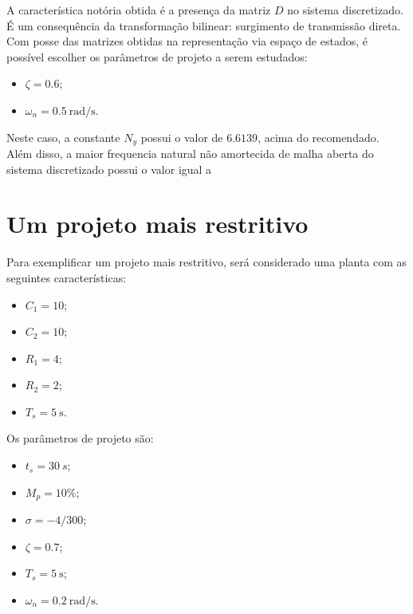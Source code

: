 A característica notória obtida é a presença da matriz $D$ no sistema discretizado. É um consequência da transformação bilinear: surgimento de transmissão direta. Com posse das matrizes obtidas na representação via espaço de estados, é possível escolher os parâmetros de projeto a serem estudados:
\begin{itemize}
  \item $\zeta = 0.6$;
  \item $\omega_n = \SI{0.5}{\radian/\second}$.
\end{itemize}

Neste caso, a constante $N_y$ possui o valor de $6.6139$, acima do recomendado. Além disso, a maior frequencia natural não amortecida de malha aberta do sistema discretizado possui o valor igual a

\section{Um projeto mais restritivo}
Para exemplificar um projeto mais restritivo, será considerado uma planta com as seguintes características:
\begin{itemize}
  \item $C_1 = 10$;
  \item $C_2 = 10$;
  \item $R_1 = 4$;
  \item $R_2 = 2$;
  \item $T_s = \SI{5}{\second}$.
\end{itemize}

Os parâmetros de projeto são:
\begin{itemize}
  \item $t_s = \SI{30}{s}$;
  \item $M_p = 10\%$;
\end{itemize}

\begin{itemize}
  \item $\sigma = -4/300$;
  \item $\zeta = 0.7$;
  \item $T_s = \SI{5}{\second}$;
  \item $\omega_n = \SI{0.2}{\radian/\second}$.
\end{itemize}